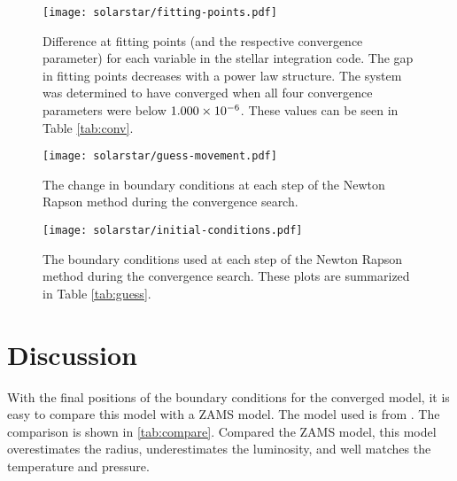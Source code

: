 \documentclass[10pt]{article}
\begin{document}
\begin{table}[htbp]
\begin{center}
\label{tab:conv}

 \end{center}
 \end{table}
 
 \begin{figure}[htbp]
    \centering
    \texttt{[image: solarstar/fitting-points.pdf]}
    \caption[Gaps at Fitting Points]{Difference at fitting points (and the respective convergence parameter) for each variable in the stellar integration code. The gap in fitting points decreases with a power law structure. The system was determined to have converged when all four convergence parameters were below $1.000 \times 10^{-6}$. These values can be seen in Table \ref{tab:conv}.}
    \label{fig:conv}
 \end{figure}
 
  \begin{figure}[htbp]
    \centering
    \texttt{[image: solarstar/guess-movement.pdf]}
    \caption[Boundary Point Movement]{The change in boundary conditions at each step of the Newton Rapson method during the convergence search.}
    \label{fig:boundarydelta}
 \end{figure}
 \begin{figure}[htbp]
    \centering
    \texttt{[image: solarstar/initial-conditions.pdf]}
    \caption[Boundary Points]{The boundary conditions used at each step of the Newton Rapson method during the convergence search. These plots are summarized in Table \ref{tab:guess}.}
    \label{fig:boundary}
 \end{figure}    


\section{Discussion} \label{sec:discussion}
With the final positions of the boundary conditions for the converged model, it is easy to compare this model with a ZAMS model. The model used is from \citet{hansen2004stellar}. The comparison is shown in \cref{tab:compare}. Compared the ZAMS model, this model overestimates the radius, underestimates the luminosity, and well matches the temperature and pressure.
\end{document}
